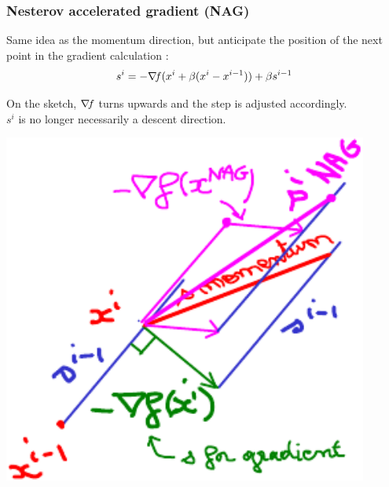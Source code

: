 \documentclass[12pt]{beamer}
\begin{document}
\begin{frame}
\frametitle{Nesterov accelerated gradient (NAG)} 
Same idea as the momentum direction, but anticipate the position of the next point in the gradient calculation
\cite{nesterov1983method}:
\begin{equation*} 
s^i = -\nabla\!{f}(x^i+\beta (x^i-x^{i-1})) + \beta s^{i-1}
\end{equation*} 
\begin{minipage}[c]{0.5\textwidth}
On the sketch, $\nabla\!{f}$ turns upwards and the step is adjusted accordingly.\\
$s^i$ is no longer necessarily a descent direction.
\end{minipage}
\begin{minipage}[c]{0.4\textwidth}
\begin{center}
\includegraphics[width=0.9\textwidth]{nag-crop.pdf} 
\end{center}
\end{minipage}
\end{frame}
\end{document}
